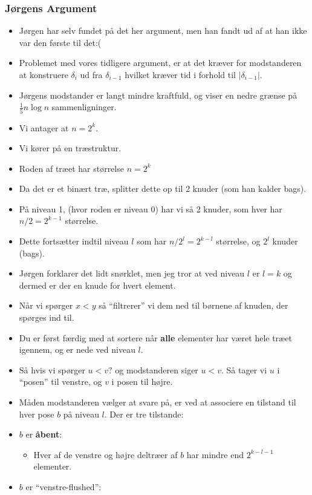 \begin{frame}[allowframebreaks]
  \frametitle{Jørgens Argument}
 \begin{itemize}
   \item Jørgen har selv fundet på det her argument, men han fandt ud af at han ikke var den første til det:(
   \item Problemet med vores tidligere argument, er at det kræver for modstanderen at konstruere $\delta_{i}$ ud fra \(\delta_{i-1}\) hvilket kræver tid i forhold til \(|\delta_{i-1}|\).
   \item Jørgens modstander er langt mindre kraftfuld, og viser en nedre grænse på $\frac{1}{5}n \log n$ sammenligninger.
   \item Vi antager at $n = 2^{k}$.
   \item Vi kører på en træstruktur.
   \item Roden af træet har størrelse $n = 2^{k}$
   \item Da det er et binært træ, splitter dette op til 2 knuder (som han kalder bags).
   \item På niveau 1, (hvor roden er niveau 0) har vi så 2 knuder, som hver har $n/2 = 2^{k-1}$ størrelse.
   \item Dette fortsætter indtil niveau $l$ som har $n/2^{l} = 2^{k-l}$ størrelse, og $2^{l}$ knuder (bags).
   \item Jørgen forklarer det lidt snørklet, men jeg tror at ved niveau $l$ er $l = k$ og dermed er der en knude for hvert element.
   \item Når vi spørger $x < y$ så ``filtrerer'' vi dem ned til børnene af knuden, der spørges ind til.
   \item Du er først færdig med at sortere når \textbf{alle} elementer har været hele træet igennem, og er nede ved niveau $l$.
   \item Så hvis vi spørger $u < v?$ og modstanderen siger $u < v$. Så tager vi $u$ i ``posen'' til venstre, og $v$ i posen til højre.
   \item Måden modstanderen vælger at svare på, er ved at associere en tilstand til hver pose $b$ på niveau $l$. Der er tre tilstande:
   \item $b$ er \textbf{åbent}:
         \begin{itemize}
           \item Hver af de venstre og højre deltræer af $b$ har mindre end $2^{k-l-1}$ elementer.
         \end{itemize}
   \item $b$ er ``venstre-flushed'':

\end{itemize}
\end{frame}
